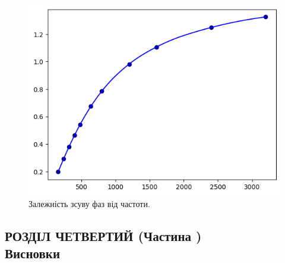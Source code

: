 \documentclass[a4paper,12pt]{article}
\newcommand{\RomanNumeralCaps}[1]{\MakeUppercase{\romannumeral #1}}
\begin{document}
\newpage
    \begin{figure}[h!]
		\centering
		\begin{minipage}[h]{1\linewidth}
			\includegraphics[width=0.8\linewidth]{Prt sc/Figure_6.png}
			\caption{Залежність зсуву фаз від частоти.}
			\label{Figure_6}
		\end{minipage}
	\end{figure}

\newpage
	\begin{center}
		\section* {РОЗДІЛ ЧЕТВЕРТИЙ (Частина \RomanNumeralCaps{2})\\Висновки}
	\end{center}
\end{document}
